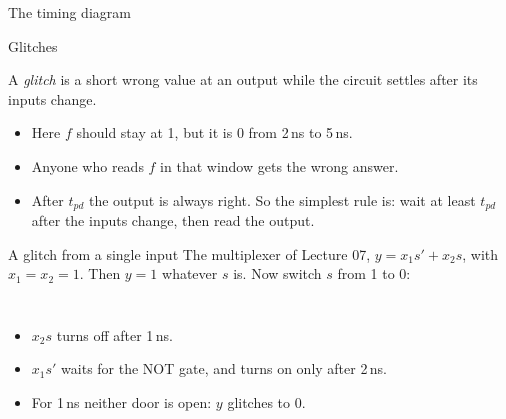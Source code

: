 \documentclass[10pt]{wosm-slides}
\newcommand*\wave[3]{%
  \pgfmathsetmacro\wy{-#1*0.52}
  \node[left, font=\scriptsize] at (-1.1,\wy+0.14) {#2};
  \foreach \v [count=\i from -1, remember=\v as \pv (initially X)] in {#3} {
    \draw[wosm-text, line width=0.9pt] (\i,\wy+\v*0.28) -- (\i+1,\wy+\v*0.28);
    \if\pv X\else
      \draw[wosm-text, line width=0.9pt] (\i,\wy+\pv*0.28) -- (\i,\wy+\v*0.28);
    \fi
  }}
\newcommand*\timeaxis[1]{%
  \pgfmathsetmacro\wy{-#1*0.52+0.22}
  \draw[wosm-muted, line width=0.4pt] (-1,\wy) -- (7,\wy);
  \foreach \t in {0,...,6}
    \draw[wosm-muted, line width=0.4pt] (\t,\wy) -- ++(0,-0.08)
      node[below, font=\tiny] {\t};
  \node[right, font=\tiny, text=wosm-muted] at (7,\wy) {ns};}
\newcommand*\tmark[3]{%
  \draw[wosm-brick, dashed, line width=0.5pt] (#1,0.45) -- (#1,{-#2*0.52+0.22});
  \node[above, font=\scriptsize, text=wosm-brick] at (#1,0.4) {#3};}
\begin{document}
\begin{frame}{The timing diagram}
  \begin{center}
  \end{center}
\end{frame}

\begin{frame}{Glitches}
  \begin{definition}[Glitch]
    A \emph{glitch} is a short wrong value at an output while the circuit settles
    after its inputs change.
  \end{definition}

  \begin{itemize}
    \item Here $f$ should stay at 1, but it is 0 from 2\,ns to 5\,ns.
    \item Anyone who reads $f$ in that window gets the wrong answer.
    \item After $t_{pd}$ the output is always right. So the simplest rule is: wait at
      least $t_{pd}$ after the inputs change, then read the output.
  \end{itemize}

  \bigskip
\end{frame}

\begin{frame}{A glitch from a single input}
  The multiplexer of Lecture 07, $y = x_1 s' + x_2 s$, with $x_1 = x_2 = 1$. Then
  $y = 1$ whatever $s$ is. Now switch $s$ from 1 to 0:

  \medskip
  \begin{columns}[c, totalwidth=\textwidth]
      \centering
      \begin{itemize}
        \item $x_2 s$ turns off after 1\,ns.
        \item $x_1 s'$ waits for the NOT gate, and turns on only after 2\,ns.
        \item For 1\,ns neither door is open: $y$ glitches to 0.
      \end{itemize}
  \end{columns}
\end{frame}
\end{document}
